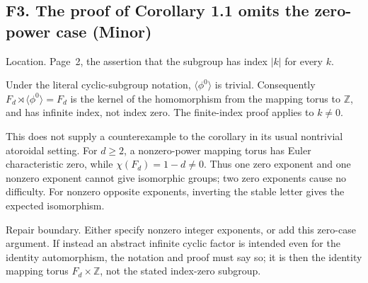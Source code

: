 \documentclass[10pt]{article}
\begin{document}
\subsection*{F3. The proof of Corollary 1.1 omits the zero-power case (Minor)}
Location. Page 2, the assertion that the subgroup has index \(|k|\) for every \(k\).\par
Under the literal cyclic-subgroup notation, \(\langle\phi^0\rangle\) is trivial. Consequently \(F_d\rtimes\langle\phi^0\rangle=F_d\) is the kernel of the homomorphism from the mapping torus to \(\mathbb Z\), and has infinite index, not index zero. The finite-index proof applies to \(k\ne0\).\par
This does not supply a counterexample to the corollary in its usual nontrivial atoroidal setting. For \(d\ge2\), a nonzero-power mapping torus has Euler characteristic zero, while \(\chi(F_d)=1-d\ne0\). Thus one zero exponent and one nonzero exponent cannot give isomorphic groups; two zero exponents cause no difficulty. For nonzero opposite exponents, inverting the stable letter gives the expected isomorphism.\par
Repair boundary. Either specify nonzero integer exponents, or add this zero-case argument. If instead an abstract infinite cyclic factor is intended even for the identity automorphism, the notation and proof must say so; it is then the identity mapping torus \(F_d\times\mathbb Z\), not the stated index-zero subgroup.\par
\end{document}
